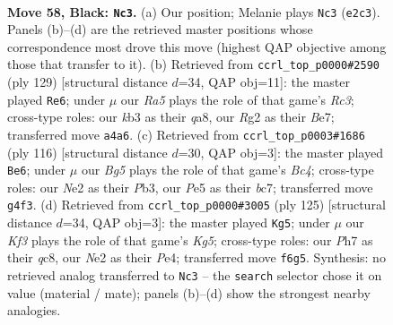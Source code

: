 \documentclass[11pt]{article}
\begin{document}
\clearpage

\begin{figure}[p]\centering
\begin{subfigure}{0.46\textwidth}\centering
\resizebox{\linewidth}{!}{%
\newchessgame
\chessboard[
  setfen={8/7p/5k2/4p3/rp4b1/1K6/4n1r1/8 b - - 7 58},
  showmover=false,
  pgfstyle=straightmove, color=movearrow, markmove={e2-c3}
]}
\caption{}
\end{subfigure}\hfill
\begin{subfigure}{0.46\textwidth}\centering
\resizebox{\linewidth}{!}{%
\newchessgame
\chessboard[
  setfen={Q7/4b3/p1r2k2/K1p5/8/8/2P5/8 b - - 42 65},
  showmover=false,
  pgfstyle=straightmove, color=movearrow, markmove={c6-e6}
]}
\caption{}
\end{subfigure}
\\[4pt]
\begin{subfigure}{0.46\textwidth}\centering
\resizebox{\linewidth}{!}{%
\newchessgame
\chessboard[
  setfen={8/2b5/6p1/8/2B4k/1P3R1P/1r6/6K1 w - - 3 59},
  showmover=false,
  pgfstyle=straightmove, color=movearrow, markmove={c4-e6}
]}
\caption{}
\end{subfigure}\hfill
\begin{subfigure}{0.46\textwidth}\centering
\resizebox{\linewidth}{!}{%
\newchessgame
\chessboard[
  setfen={2Q5/5r1b/8/3K4/4p1kp/8/8/8 b - - 5 63},
  showmover=false,
  pgfstyle=straightmove, color=movearrow, markmove={g4-g5}
]}
\caption{}
\end{subfigure}
\caption{\textbf{Move 58, Black: \texttt{Nc3}.} (a) Our position; Melanie plays \texttt{Nc3} (\texttt{e2c3}). Panels (b)--(d) are the retrieved master positions whose correspondence most drove this move (highest QAP objective among those that transfer to it). (b) Retrieved from \texttt{ccrl\_top\_p0000\#2590} (ply 129) [structural distance $d$=34, QAP obj=11]: the master played \texttt{Re6}; under $\mu$ our \emph{Ra5} plays the role of that game's \emph{Rc3}; cross-type roles: our \emph{k}b3 as their \emph{q}a8, our \emph{R}g2 as their \emph{B}e7; transferred move \texttt{a4a6}. (c) Retrieved from \texttt{ccrl\_top\_p0003\#1686} (ply 116) [structural distance $d$=30, QAP obj=3]: the master played \texttt{Be6}; under $\mu$ our \emph{Bg5} plays the role of that game's \emph{Bc4}; cross-type roles: our \emph{N}e2 as their \emph{P}b3, our \emph{P}e5 as their \emph{b}c7; transferred move \texttt{g4f3}. (d) Retrieved from \texttt{ccrl\_top\_p0000\#3005} (ply 125) [structural distance $d$=34, QAP obj=3]: the master played \texttt{Kg5}; under $\mu$ our \emph{Kf3} plays the role of that game's \emph{Kg5}; cross-type roles: our \emph{P}h7 as their \emph{q}c8, our \emph{N}e2 as their \emph{P}e4; transferred move \texttt{f6g5}. Synthesis: no retrieved analog transferred to \texttt{Nc3} -- the \texttt{search} selector chose it on value (material / mate); panels (b)--(d) show the strongest nearby analogies.}
\label{fig:thought-m115}
\end{figure}
\end{document}
